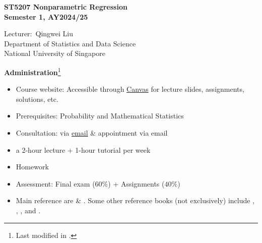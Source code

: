 \documentclass[19pt,landscaoe]{article}
\begin{document}
%

\begin{titlepage}
\begin{center}
    \vfill
\textbf{\huge ST5207 Nonparametric Regression\\
Semester 1, AY2024/25}\\[4cm]
\begin{minipage}{0.4\textwidth}
\begin{center} \large
Lecturer:~Qingwei Liu\\
\vskip 6pt
Department of Statistics and Data Science\\
\vskip 6pt
National University of Singapore
\end{center}
\end{minipage}%
\vfill
\vfill
\end{center}

\end{titlepage}
%
\newpage
{\LARGE\centerline{\textbf {Administration}\footnote{Last modified in .}}}
\vskip25pt
\begin{minipage}{.9\textwidth}
    \Large
\begin{itemize}
\item Course website: Accessible through \href{https://www.nus.edu.sg/canvas/login/}{Canvas} for lecture slides, assignments, solutions, etc. 
\item Prerequisites: Probability and Mathematical Statistics 
\item Consultation: via \href{mailto:liu_qw@nus.edu.sg}{ email} \& appointment via email
\item a 2-hour lecture + 1-hour tutorial per week
\item Homework
\item Assessment: Final exam ($60\%$) + Assignments ($40\%$)
\item Main reference are \cite{hardle04} \& \cite{scott15}. Some other reference books (not exclusively) include \cite{simonoff12}, \cite{takezawa05}, \cite{Hall13}, and \cite{kloke14}.

\end{itemize}
\end{minipage}
\newpage
\end{document}

